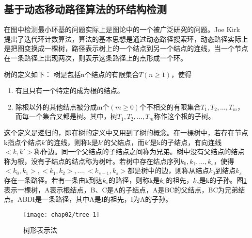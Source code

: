 \subsection{基于动态移动路径算法的环结构检测}
\label{}


在图中检测最小环基的问题实际上是图论中的一个被广泛研究的问题。Joe Kirk 提出了迭代环计数算法，算法的基本思想是通过动态路径搜索环，动态路径实际上是把图变换成一棵树，路径表示树上的一个结点到另一个结点的连线，当一个节点在一条路径上出现两次，则表示这条路径上的点形成一个环。

树的定义如下：
树是包括n个结点的有限集合$T(n \geq 1)$\cite{zhangming}，使得
\begin{enumerate}
\item 有且只有一个特定的成为根的结点。
\item 除根以外的其他结点被分成m个$(m \geq 0)$个不相交的有限集合$T_1, T_2, \ldots, T_m$，而每一个集合又都是树。其中，树$T_1, T_2, \ldots, T_m$称作这个根的子树。
\end{enumerate}

这个定义是递归的，即在树的定义中又用到了树的概念。在一棵树中，若存在节点k指点个结点$k'$的连线，则称k是$k'$的父结点，而$k'$是k的子结点，有向连线$<k, k'>$称作边。同一个父结点的子结点之间称为兄弟。树中没有父结点的结点称为根，没有子结点的结点称为树叶。若树中存在结点序列$k_0,k_1,\ldots,k_s$，使得$<k_0,k_1>,<k_1,k_2>,\ldots,<k_{s-1},k_s>$都是树中的边，则称从结点$k_0$到结点$k_s$存在一条路径。若有一条由k到达$k_s$的路径，则称k是$k_s$的祖先，$k_s$是k的子孙。图\ref{fig:tree}表示一棵树，A表示根结点，B、C是A的子结点，A是BC的父结点，BC为兄弟结点。ABDI是一条路径，其中A是I的祖先，I为A的子孙。

\begin{figure}
\centering
\texttt{[image: chap02/tree-1]}
\caption{树形表示法}
\label{fig:tree}
\end{figure}

